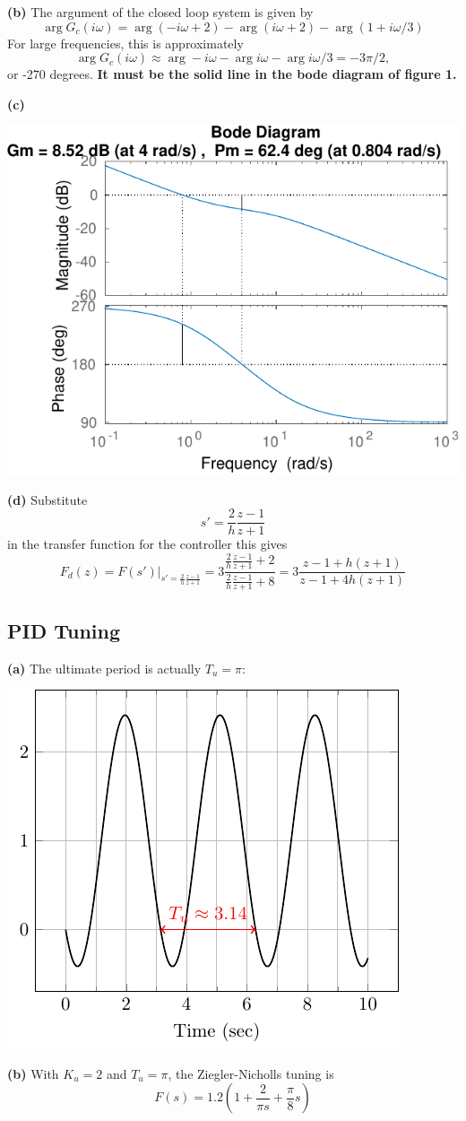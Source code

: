 \documentclass{scrartcl}
\begin{document}
\textbf{(b)} The argument of the closed loop system is given by
\[ \arg G_c(i\omega) = \arg(-i\omega+2) - \arg(i\omega+2) - \arg(1+i\omega/3) \]
For large frequencies, this is approximately
\[ \arg G_c(i\omega) \approx \arg -i\omega - \arg i\omega - \arg i\omega/3 = -3\pi/2, \]
or -270 degrees. \textbf{It must be the solid line in the bode diagram of figure 1.}

\textbf{(c)}  
  \begin{center}
  \includegraphics[width=0.5\linewidth]{bode-nonminopen-margin-crop}
  \end{center}

\textbf{(d)}
  Substitute
  \[ s' = \frac{2}{h}\frac{z-1}{z+1}\]
  in the transfer function for the controller this gives
  \[ F_d(z) = F(s')|_{s'=\frac{2}{h}\frac{z-1}{z+1}} = 3\frac{\frac{2}{h}\frac{z-1}{z+1}+2}{\frac{2}{h}\frac{z-1}{z+1} + 8} = 
3\frac{z-1 + h(z+1)}{z-1 + 4h(z+1)}\] 
\subsection{PID Tuning}
\label{sec-3-2}

   \textbf{(a)} The ultimate period is actually $T_u=\pi$:
     \begin{center}
     \includegraphics[width=0.5\linewidth]{bode-nonmincritical-solution}
     \end{center}

   \textbf{(b)} With $K_u=2$ and $T_u=\pi$, the Ziegler-Nicholls tuning is
   \[ F(s) = 1.2\left(1 + \frac{2}{\pi s} + \frac{\pi}{8} s \right) \]
\end{document}
